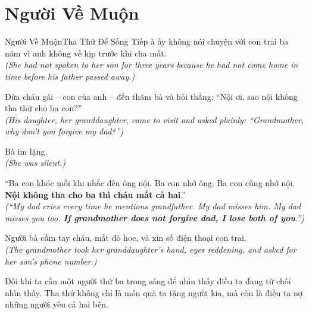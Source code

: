 \section{Người Về Muộn}
\begin{truyen}{Người Về Muộn}{Tha Thứ Để Sống Tiếp}
à ấy không nói chuyện với con trai ba năm vì anh không về kịp trước khi cha mất.\\
\textit{(She had not spoken to her son for three years because he had not come home in time before his father passed away.)}

Đứa cháu gái -- con của anh -- đến thăm bà và hỏi thẳng: ``Nội ơi, sao nội không tha thứ cho ba con?''\\
\textit{(His daughter, her granddaughter, came to visit and asked plainly: ``Grandmother, why don't you forgive my dad?'')}

Bà im lặng.\\
\textit{(She was silent.)}

``Ba con khóc mỗi khi nhắc đến ông nội. Ba con nhớ ông. Ba con cũng nhớ nội. \textbf{Nội không tha cho ba thì cháu mất cả hai}.''\\
\textit{(``My dad cries every time he mentions grandfather. My dad misses him. My dad misses you too. \textbf{If grandmother does not forgive dad, I lose both of you}.'')}

Người bà cầm tay cháu, mắt đỏ hoe, và xin số điện thoại con trai.\\
\textit{(The grandmother took her granddaughter's hand, eyes reddening, and asked for her son's phone number.)}
\end{truyen}
\begin{baihoc}
  Đôi khi ta cần một người thứ ba trong sáng để nhìn thấy điều ta đang từ chối nhìn thấy. Tha thứ không chỉ là món quà ta tặng người kia, mà còn là điều ta nợ những người yêu cả hai bên.
\end{baihoc}
